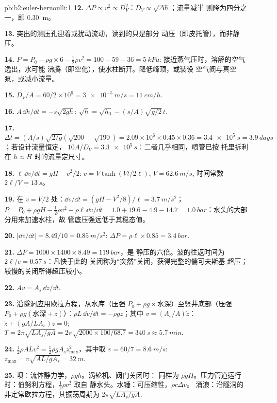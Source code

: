 \begin{solution}{pb:b2:euler-bernoulli:1}
\textbf{12.} $\Delta P \propto v^2 \propto D_V^2$：$D_V \propto \sqrt{\Delta h}$；流量减半
则降为四分之一，即 \qty{0.30}{m}。

\textbf{13.} 突出的测压孔迎着或扰动流动，读到的只是部分
动压（即皮托管），而非静压。

\textbf{14.} $P = P_0 - \rho g \times 6 - \tfrac12\rho v^2 = 100 - 59 - 36 = \qty{5}{kPa}$:
接近蒸气压时，溶解的空气逸出，水可能
沸腾（即空化），使水柱断开。降低峰顶，或装设
空气阀与真空泵，或减小流量。

\textbf{15.} $D_V/A = 60/2 \times 10^6 = \qty{3e-5}{m/s} = \qty{11}{cm/h}$.

\textbf{16.} $A\,\dd h/\dd t = -s\sqrt{2gh}$: $\sqrt h = \sqrt{h_0} - (s/A)\sqrt{g/2}\,t$.

\textbf{17.} $\Delta t = (A/s)\sqrt{2/g}(\sqrt{200} - \sqrt{190}) = 2.09 \times 10^6 \times
0.45 \times 0.36 = \qty{3.4e5}{s} = \qty{3.9}{days}$；若设计流量恒定，
$10A/D_V = \qty{3.3e5}{s}$：二者几乎相同，喷管已按
托里拆利在 $h \approx H$ 时的流量定尺寸。

\textbf{18.} $\ell\,\dd v/\dd t = gH - v^2/2$: $v = V\tanh(Vt/2\ell)$, $V = \qty{62.6}{m/s}$,
时间常数 $2\ell/V = \qty{13}{s}$。

\textbf{19.} 在 $v = V/2$ 处：$\dd v/\dd t = (gH - V^2/8)/\ell = \qty{3.7}{m/s^2}$；
$P = P_0 + \rho gH - \tfrac12\rho v^2 - \rho\ell\,\dd v/\dd t = 1.0 + 19.6 - 4.9 - 14.7
= \qty{1.0}{bar}$：水头的大部分用来加速水柱，故
管底压强远低于其稳态值。

\textbf{20.} $|\dd v/\dd t| = 8.49/10 = \qty{0.85}{m/s^2}$: $\Delta P = \rho\ell \times 0.85 =
\qty{3.4}{bar}$.

\textbf{21.} $\Delta P = 1000 \times 1400 \times 8.49 = \qty{119}{bar}$，是
静压的六倍。波的往返时间为 $2\ell/c = \qty{0.57}{s}$：凡快于此的
关闭称为“突然”关闭，获得完整的儒可夫斯基
超压；较慢的关闭所得超压较小。

\textbf{22.} $Av = A_s\,\dd z/\dd t$.

\textbf{23.} 沿隧洞应用欧拉方程，从水库（压强
$P_0 + \rho g\times$水深）至竖井底部（压强 $P_0 + \rho g
(\text{水深} + z)$）：$\rho L\,\dd v/\dd t = -\rho gz$；其中 $v = (A_s/A)\dot z$：
$\ddot z + (gA/LA_s)z = 0$; $T = 2\pi\sqrt{LA_s/gA} = 2\pi\sqrt{2000 \times 100/
68.7} = \qty{340}{s} \approx \qty{5.7}{min}$.

\textbf{24.} $\tfrac12\rho ALv^2 = \tfrac12\rho gA_sz_{\max}^2$，其中取 $v = 60/7 =
\qty{8.6}{m/s}$: $z_{\max} = v\sqrt{AL/gA_s} = \qty{32}{m}$.

\textbf{25.} 坝：流体静力学，$\rho gh$。涡轮机、阀门关闭时：
同样为 $\rho gH$。压力管道运行时：伯努利方程，$\tfrac12\rho v^2$ 取自
静水头。水锤：可压缩性，$\rho c\Delta v$。
涌浪：沿隧洞的非定常欧拉方程，其振荡周期为
$2\pi\sqrt{LA_s/gA}$.
\end{solution}
